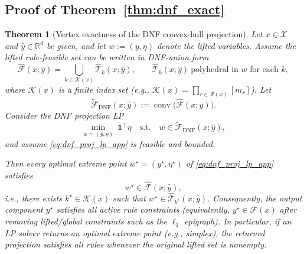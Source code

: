 \documentclass{article}
\theoremstyle{plain}
\newtheorem{theorem}{Theorem}[section]
\theoremstyle{definition}
\theoremstyle{remark}
\begin{document}
\subsection{Proof of Theorem~\ref{thm:dnf_exact}}\label{app:dnfexact}

\begin{theorem}[Vertex exactness of the DNF convex-hull projection]\label{thm:dnf_exact_app}
Let $x\in\mathcal{X}$ and $\hat y\in\mathbb{R}^d$ be given, and let $w:=(y,\eta)$ denote the lifted variables.
Assume the lifted rule-feasible set can be written in DNF-union form
\begin{equation}
\widehat{\mathcal{F}}(x;\hat y)
=
\bigcup_{k\in\mathcal{K}(x)} \widehat{\mathcal{T}}_{k}(x;\hat y),
\qquad
\widehat{\mathcal{T}}_{k}(x;\hat y)\ \text{polyhedral in $w$ for each $k$},
\end{equation}
where $\mathcal{K}(x)$ is a finite index set (e.g., $\mathcal{K}(x)=\prod_{r\in\mathcal{R}(x)}[m_r]$).
Let
\[
\widetilde{\mathcal{F}}_{\mathrm{DNF}}(x;\hat y)
:=
\operatorname{conv}\!\big(\widehat{\mathcal{F}}(x;\hat y)\big).
\]
Consider the DNF projection LP
\begin{equation}\label{eq:dnf_proj_lp_app}
\min_{w=(y,\eta)} \ \mathbf{1}^\top \eta
\quad \text{s.t.}\quad
w \in \widetilde{\mathcal{F}}_{\mathrm{DNF}}(x;\hat y),
\end{equation}
and assume \eqref{eq:dnf_proj_lp_app} is feasible and bounded.

Then every \emph{optimal extreme point} $w^\star=(y^\star,\eta^\star)$ of \eqref{eq:dnf_proj_lp_app}
satisfies
\[
w^\star \in \widehat{\mathcal{F}}(x;\hat y),
\]
i.e., there exists $k^\star\in\mathcal{K}(x)$ such that $w^\star\in \widehat{\mathcal{T}}_{k^\star}(x;\hat y)$.
Consequently, the output component $y^\star$ satisfies all active rule constraints (equivalently, $y^\star\in\mathcal{F}(x)$ after removing
lifted/global constraints such as the $\ell_1$ epigraph).
In particular, if an LP solver returns an optimal extreme point (e.g., simplex), the returned projection satisfies all rules whenever the original lifted set is nonempty.
\end{theorem}
\end{document}
